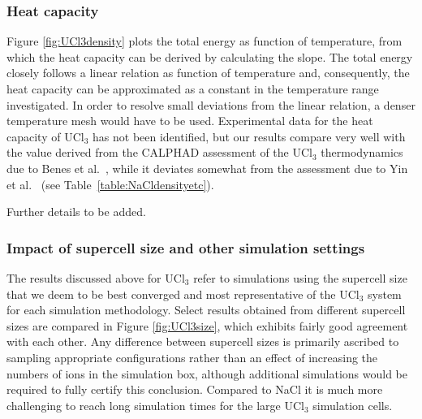 \documentclass[preprint,3p,10pt,onecolumn,number,sort&compress]{elsarticle}
\begin{document}
\subsubsection{Heat capacity} 
Figure \ref{fig:UCl3density} plots the total energy as function of temperature, from which the heat capacity can be derived by calculating the slope. The total energy closely follows a linear relation as function of temperature and, consequently, the heat capacity can be approximated as a constant in the temperature range investigated. In order to resolve small deviations from the linear relation, a denser temperature mesh would have to be used. 
Experimental data for the heat capacity of UCl$_3$ has not been identified, but our results compare very well with the value derived from the CALPHAD assessment of the UCl$_3$ thermodynamics due to Benes et al.~\cite{BENES2008}, while it deviates somewhat from the assessment due to Yin et al.~\cite{YIN2020} (see Table~\ref{table:NaCldensityetc}). %




{\color{red} Further details to be added.}

\subsubsection{Impact of supercell size and other simulation settings}
The results discussed above for UCl$_3$ refer to simulations using the supercell size that we deem to be best converged and most representative of the UCl$_3$ system for each simulation methodology. Select results obtained from different supercell sizes are compared in Figure \ref{fig:UCl3size}, which exhibits fairly good agreement with each other. Any difference between supercell sizes is primarily ascribed to sampling appropriate configurations rather than an effect of increasing the numbers of ions in the simulation box, although additional simulations would be required to fully certify this conclusion. Compared to NaCl it is much more challenging to reach long simulation times for the large UCl$_3$ simulation cells. 
\end{document}
